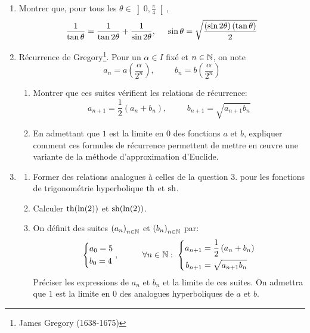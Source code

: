 \begin{enumerate}
  \item Montrer que, pour tous les $\theta\in \left]0,\frac{\pi}{4} \right[$,
\begin{displaymath}
  \frac{1}{\tan \theta} = \frac{1}{\tan 2\theta} + \frac{1}{\sin 2\theta},\hspace{0.5cm}
  \sin \theta = \sqrt{\frac{(\sin 2\theta)\, (\tan \theta)}{2}}
\end{displaymath}

\item Récurrence de Gregory\footnote{James Gregory (1638-1675)}. 
Pour un $\alpha\in I$ fixé et $n\in \mathbb{N}$, on note 
\begin{displaymath}
  a_n = a(\frac{\alpha}{2^{n}}),\hspace{1cm} b_n = b(\frac{\alpha}{2^{n}})
\end{displaymath}
\begin{enumerate}
  \item Montrer que ces suites vérifient les relations de récurrence:
\begin{displaymath}
  a_{n+1} = \frac{1}{2}\left( a_n + b_n\right), \hspace{1cm} b_{n+1} = \sqrt{a_{n+1}b_n} 
\end{displaymath}
  \item En admettant que $1$ est la limite en $0$ des fonctions $a$ et $b$, expliquer comment ces formules de récurrence permettent de mettre en \oe{}uvre une variante de la méthode d'approximation d'Euclide.
\end{enumerate}

\item
\begin{enumerate}
  \item Former des relations analogues à celles de la question 3. pour les fonctions de trigonométrie hyperbolique $\operatorname{th}$ et $\operatorname{sh}$.
  \item Calculer $\operatorname{th}(\ln(2))$ et $\operatorname{sh}(\ln(2))$.
  \item On définit des suites $\left( a_n\right)_{n\in \mathbb{N}}$ et $\left( b_n\right)_{n\in \mathbb{N}}$ par:
\begin{displaymath}
  \left\lbrace 
  \begin{aligned}
    &a_0 = 5 \\ &b_0 = 4
  \end{aligned}
\right. , \hspace{1cm} \forall n\in \mathbb{N}:\;
\left\lbrace 
\begin{aligned}
  a_{n+1} &= \frac{1}{2}\left( a_n + b_n\right)\\ b_{n+1} &= \sqrt{a_{n+1}b_n} 
\end{aligned}
\right. 
\end{displaymath}
Préciser les expressions de $a_n$ et $b_n$ et la limite de ces suites. On admettra que $1$ est la limite en $0$ des analogues hyperboliques de $a$ et $b$. 
\end{enumerate}

\end{enumerate}
